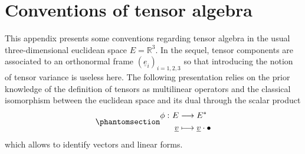 \documentclass[
  a4paper,
  numbers=noendperiod,
  DIV=12]{scrreprt}
\newcommand{\R}{{\mathbb{{R}}}}
\newcommand{\uv}[1]{{\underline{{#1}}}}
\newcommand{\ve}[1]{{\uv{{e}}_{{#1}}}}
\begin{document}
\section{Conventions of tensor
algebra}\label{sec-tensoralgebra_convention}

This appendix presents some conventions regarding tensor algebra in the
usual three-dimensional euclidean space \(E=\R^3\). In the sequel,
tensor components are associated to an orthonormal frame
\((\ve{i})_{i=1,2,3}\) so that introducing the notion of tensor variance
is useless here. The following presentation relies on the prior
knowledge of the definition of tensors as multilinear operators and the
classical isomorphism between the euclidean space and its dual through
the scalar product
\begin{equation}\protect\phantomsection\label{eq-scalarprod}{\begin{align}
\phi\,\colon E & \longrightarrow  E^* \\
       \uv{v} & \longmapsto \uv{v}\cdot\bullet
\end{align}}\end{equation} which allows to identify vectors and linear
forms.
\end{document}
